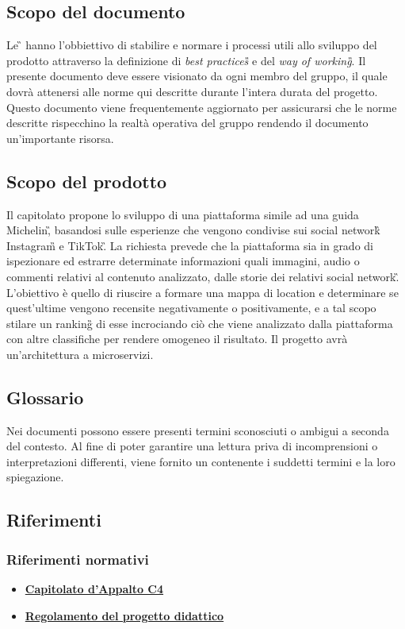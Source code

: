 \subsection{Scopo del documento}
Le \NdP{}\G{} hanno l'obbiettivo di stabilire e normare i processi utili allo sviluppo del prodotto attraverso la definizione di \emph{best practices\G{}} e del \emph{way of working\G{}}.
Il presente documento deve essere visionato da ogni membro del gruppo, il quale dovrà attenersi alle norme qui descritte durante l'intera durata del progetto.
Questo documento viene frequentemente aggiornato per assicurarsi che le norme descritte rispecchino la realtà operativa del gruppo rendendo il documento un'importante risorsa.
\subsection{Scopo del prodotto}
Il capitolato propone lo sviluppo di una piattaforma simile ad una guida Michelin\G, basandosi sulle esperienze che vengono condivise sui social network\G{} Instagram\G{} e TikTok\G.
La richiesta prevede che la piattaforma sia in grado di ispezionare ed estrarre determinate informazioni quali immagini, audio o commenti relativi al contenuto analizzato, dalle storie dei relativi social network\G.
L'obiettivo è quello di riuscire a formare una mappa di location e determinare se quest'ultime vengono recensite negativamente o positivamente, e a tal scopo stilare un ranking\G{} di esse incrociando ciò che viene analizzato dalla piattaforma con altre classifiche per rendere omogeneo il risultato.
Il progetto avrà un'architettura a microservizi.
\subsection{Glossario}
Nei documenti possono essere presenti termini sconosciuti o ambigui a seconda del contesto. Al fine di poter garantire una lettura priva di incomprensioni o interpretazioni differenti, viene fornito un \Glo{} contenente i suddetti termini e la loro spiegazione. %
\subsection{Riferimenti}
\subsubsection{Riferimenti normativi}
\begin{itemize}
	\item
	\href{https://www.math.unipd.it/~tullio/IS-1/2021/Progetto/C4p.pdf}{\textbf{Capitolato d'Appalto C4}}
	\item
	\href{https://www.math.unipd.it/~tullio/IS-1/2021/Dispense/PD2.pdf}{\textbf{Regolamento del progetto didattico}}
\end{itemize}
